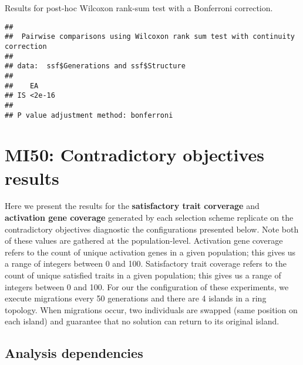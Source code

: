 \documentclass[]{book}
\newenvironment{Shaded}{\begin{snugshade}}{\end{snugshade}}
\newcommand{\DataTypeTok}[1]{\textcolor[rgb]{0.13,0.29,0.53}{#1}}
\newcommand{\KeywordTok}[1]{\textcolor[rgb]{0.13,0.29,0.53}{\textbf{#1}}}
\newcommand{\NormalTok}[1]{#1}
\newcommand{\OperatorTok}[1]{\textcolor[rgb]{0.81,0.36,0.00}{\textbf{#1}}}
\newcommand{\OtherTok}[1]{\textcolor[rgb]{0.56,0.35,0.01}{#1}}
\newcommand{\StringTok}[1]{\textcolor[rgb]{0.31,0.60,0.02}{#1}}
\begin{document}
Results for post-hoc Wilcoxon rank-sum test with a Bonferroni correction.

\begin{Shaded}
\end{Shaded}

\begin{verbatim}
## 
##  Pairwise comparisons using Wilcoxon rank sum test with continuity correction 
## 
## data:  ssf$Generations and ssf$Structure 
## 
##    EA    
## IS <2e-16
## 
## P value adjustment method: bonferroni
\end{verbatim}

\hypertarget{mi50-contradictory-objectives-results}{%
\chapter{MI50: Contradictory objectives results}\label{mi50-contradictory-objectives-results}}

Here we present the results for the \textbf{satisfactory trait corverage} and \textbf{activation gene coverage} generated by each selection scheme replicate on the contradictory objectives diagnostic the configurations presented below.
Note both of these values are gathered at the population-level.
Activation gene coverage refers to the count of unique activation genes in a given population; this gives us a range of integers between 0 and 100.
Satisfactory trait coverage refers to the count of unique satisfied traits in a given population; this gives us a range of integers between 0 and 100.
For our the configuration of these experiments, we execute migrations every 50 generations and there are 4 islands in a ring topology.
When migrations occur, two individuals are swapped (same position on each island) and guarantee that no solution can return to its original island.

\hypertarget{analysis-dependencies-6}{%
\section{Analysis dependencies}\label{analysis-dependencies-6}}
\end{document}
